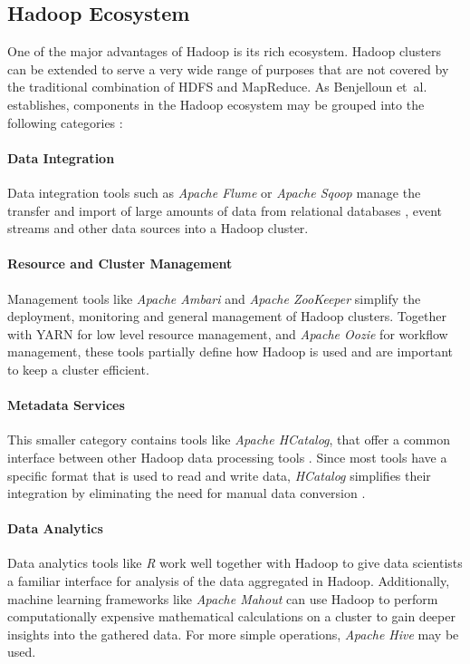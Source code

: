 \subsection{Hadoop Ecosystem}
\label{hadoop-ecosystem}
\label{sota-hadoop-ecosystem}

One of the major advantages of Hadoop is its rich ecosystem. Hadoop clusters can be extended to serve a very wide range of purposes that are not covered by the traditional combination of \ac{HDFS} and MapReduce. As Benjelloun et~al. establishes, components in the Hadoop ecosystem may be grouped into the following categories \autocite{7105553}:

\paragraph{Data Integration}
Data integration tools such as \emph{Apache Flume} or \emph{Apache Sqoop} manage the transfer and import of large amounts of data from relational databases \autocite{apache2018sqoop}, event streams and other data sources \autocite{apache2017flume} into a Hadoop cluster.

\paragraph{Resource and Cluster Management}
Management tools like \emph{Apache Ambari} and \emph{Apache ZooKeeper} simplify the deployment, monitoring and general management of Hadoop clusters. Together with \ac{YARN} for low level resource management, and \emph{Apache Oozie} for workflow management, these tools partially define how Hadoop is used and are important to keep a cluster efficient.

\paragraph{Metadata Services}
This smaller category contains tools like \emph{Apache HCatalog}, that offer a common interface between other Hadoop data processing tools \autocite{bmc2017hcatalog}. Since most tools have a specific format that is used to read and write data, \emph{HCatalog} simplifies their integration by eliminating the need for manual data conversion \autocite{bmc2017hcatalog}.

\paragraph{Data Analytics}
Data analytics tools like \emph{R} work well together with Hadoop to give data scientists 
a familiar interface for analysis of the data aggregated in Hadoop. Additionally, machine learning frameworks like \emph{Apache Mahout} can use Hadoop to perform computationally expensive mathematical calculations on a cluster to gain deeper insights into the gathered data. For more simple operations, \emph{Apache Hive} may be used.

